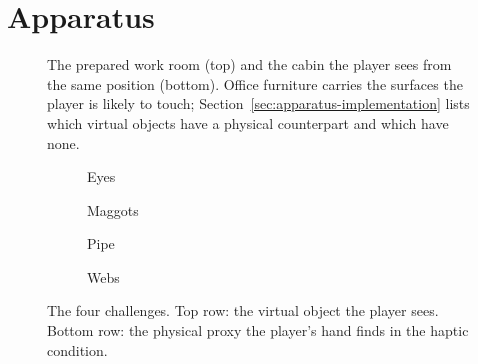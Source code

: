 
\section{Apparatus}
\label{sec:apparatus}

\begin{figure}[t]
  \centering
  \par\smallskip
  \caption{The prepared work room (top) and the cabin the player sees from the same position (bottom). Office furniture carries the surfaces the player is likely to touch; Section~\ref{sec:apparatus-implementation} lists which virtual objects have a physical counterpart and which have none.}
  \label{fig:room-cabin}
\end{figure}

\begin{figure}[t]
  \centering
  \begin{subfigure}[t]{0.235\textwidth}
    \centering
    \caption{Eyes}
    \label{fig:ch-eyes}
  \end{subfigure}\hfill
  \begin{subfigure}[t]{0.235\textwidth}
    \centering
    \caption{Maggots}
    \label{fig:ch-maggots}
  \end{subfigure}\hfill
  \begin{subfigure}[t]{0.235\textwidth}
    \centering
    \caption{Pipe}
    \label{fig:ch-pipe}
  \end{subfigure}\hfill
  \begin{subfigure}[t]{0.235\textwidth}
    \centering
    \caption{Webs}
    \label{fig:ch-webs}
  \end{subfigure}
  \caption{The four challenges. Top row: the virtual object the player sees. Bottom row: the physical proxy the player's hand finds in the haptic condition.}
  \label{fig:challenges}
\end{figure}

